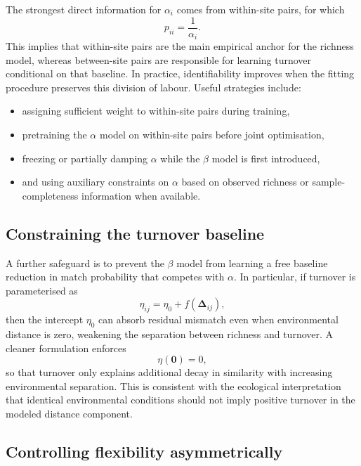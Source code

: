 \documentclass{article}
\begin{document}
The strongest direct information for \(\alpha_i\) comes from within-site pairs, for which
\begin{equation}
    p_{ii} = \frac{1}{\alpha_i}.
\end{equation}
This implies that within-site pairs are the main empirical anchor for the richness model, whereas between-site pairs are responsible for learning turnover conditional on that baseline. In practice, identifiability improves when the fitting procedure preserves this division of labour. Useful strategies include:
\begin{itemize}
    \item assigning sufficient weight to within-site pairs during training,
    \item pretraining the \(\alpha\) model on within-site pairs before joint optimisation,
    \item freezing or partially damping \(\alpha\) while the \(\beta\) model is first introduced,
    \item and using auxiliary constraints on \(\alpha\) based on observed richness or sample-completeness information when available.
\end{itemize}

\subsection{Constraining the turnover baseline}

A further safeguard is to prevent the \(\beta\) model from learning a free baseline reduction in match probability that competes with \(\alpha\). In particular, if turnover is parameterised as
\begin{equation}
    \eta_{ij} = \eta_0 + f(\bm{\Delta}_{ij}),
\end{equation}
then the intercept \(\eta_0\) can absorb residual mismatch even when environmental distance is zero, weakening the separation between richness and turnover. A cleaner formulation enforces
\begin{equation}
    \eta(\mathbf 0) = 0,
\end{equation}
so that turnover only explains additional decay in similarity with increasing environmental separation. This is consistent with the ecological interpretation that identical environmental conditions should not imply positive turnover in the modeled distance component.

\subsection{Controlling flexibility asymmetrically}
\end{document}
